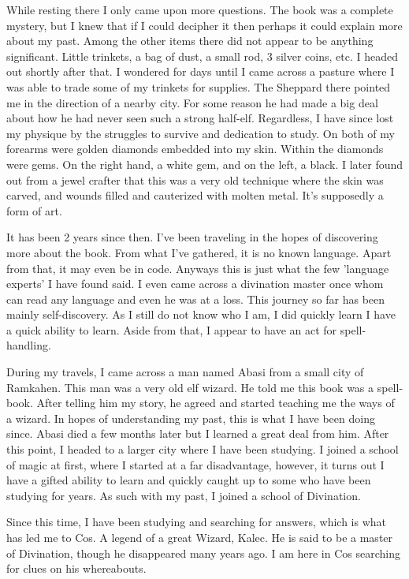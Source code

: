 \documentclass[11pt]{article}
\begin{document}
While resting there I only came upon more questions. The book was a complete mystery, but I knew that if I could decipher it then perhaps it could explain more about my past. Among the other items there did not appear to be anything significant. Little trinkets, a bag of dust, a small rod, 3 silver coins, etc. I headed out shortly after that. I wondered for days until I came across a pasture where I was able to trade some of my trinkets for supplies. The Sheppard there pointed me in the direction of a nearby city. For some reason he had made a big deal about how he had never seen such a strong half-elf. Regardless, I have since lost my physique by the struggles to survive and dedication to study. On both of my forearms were golden diamonds embedded into my skin. Within the diamonds were gems. On the right hand, a white gem, and on the left, a black. I later found out from a jewel crafter that this was a very old technique where the skin was carved, and wounds filled and cauterized with molten metal. It's supposedly a form of art.

It has been 2 years since then. I've been traveling in the hopes of discovering more about the book. From what I've gathered, it is no known language. Apart from that, it may even be in code. Anyways this is just what the few 'language experts' I have found said. I even came across a divination master once whom can read any language and even he was at a loss. This journey so far has been mainly self-discovery. As I still do not know who I am, I did quickly learn I have a quick ability to learn. Aside from that, I appear to have an act for spell-handling.

During my travels, I came across a man named Abasi from a small city of Ramkahen. This man was a very old elf wizard. He told me this book was a spell-book. After telling him my story, he agreed and started teaching me the ways of a wizard. In hopes of understanding my past, this is what I have been doing since. Abasi died a few months later but I learned a great deal from him. After this point, I headed to a larger city where I have been studying. I joined a school of magic at first, where I started at a far disadvantage, however, it turns out I have a gifted ability to learn and quickly caught up to some who have been studying for years. As such with my past, I joined a school of Divination.

Since this time, I have been studying and searching for answers, which is what has led me to Cos. A legend of a great Wizard, Kalec. He is said to be a master of Divination, though he disappeared many years ago. I am here in Cos searching for clues on his whereabouts.
\end{document}
